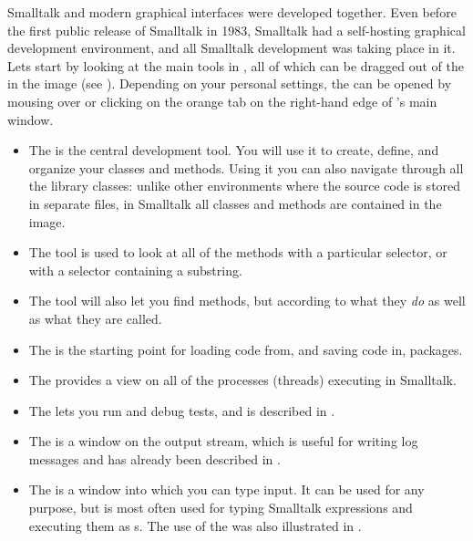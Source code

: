 \documentclass[a4paper,10pt,twoside]{book}
\begin{document}
Smalltalk and modern graphical interfaces were developed together.
Even before the first public release of Smalltalk in 1983, Smalltalk had a self-hosting graphical development environment, and all Smalltalk development was taking place in it.
Lets start by looking at the main tools in \Squeak, all of which can be dragged out of the \toolsflapind in the \sbe image (see ).
Depending on your personal settings, the \toolsflap{} can be opened by mousing over or clicking on the orange tab on the right-hand edge of \Squeak's main window.

\begin{itemize}
	\item {The } is the central development tool. You will use it to create, define, and organize your classes and methods. Using it you can also navigate through all the library classes: unlike other environments where the source code is stored in separate files, in Smalltalk all classes and methods are contained in the image.

	\item{The } tool is used to look at all of the methods with a particular selector, or with a selector containing a substring.
	
	\item{The } tool will also let you find methods, but according to what they \emph{do} as well as what they are called.
	
	\item{The } is the starting point for loading code from, and saving code in,  packages.
	
	\item{The  provides a view on all of the processes (threads) executing in Smalltalk.}
	
	\item{The } lets you run and debug \SUnit tests, and is described in .
	
	\item{The } is a window on the  output stream, which is useful for writing log messages and has already been described in .
	
	\item{The } is a window into which you can type input.  
	It can be used for any purpose, but is most often used for typing Smalltalk expressions and 
	executing them as s. The use of the  was also illustrated in .
\end{itemize}
\end{document}
